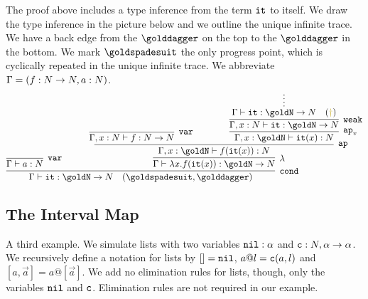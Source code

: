 The proof above includes a type inference from the term ${\tt it}$ to itself.
We draw the type inference in the picture below and we outline the unique
infinite trace. We have a back edge from the 
$\golddagger$ on the top to the $\golddagger$ in the bottom.
We mark $\goldspadesuit$ the only progress point, which is cyclically repeated in 
the unique infinite trace. We abbreviate $\Gamma = (f:{N} \rightarrow {N}, a:{N})$.
\[
{
    \infer[\cond]{ %
      \Gamma 
      \vdash \iter: \goldN \rightarrow \N 
        \quad (\goldspadesuit, \golddagger)
     }{ 
         \infer[\var]{
       \Gamma 
      \vdash a:\N}{}
     &
        {\ \ \ \ \ \ }
        {\infer[\lambda] %
         {
         \Gamma
          \vdash \lambda x.f(\iter(x)):\goldN \rightarrow \N
         }{
         \infer[\ap]{ %
           \Gamma, x:\goldN
          \vdash f(\iter(x)):\N
           }{
          \infer[\var]{
       \Gamma, x:\N 
      \vdash f:\N \rightarrow \N}{}
           {\ \ \ \ \ \ \ \ \ \ \ \ }
           {\infer[\apvar] %
            {\Gamma, x:\goldN
        \vdash \iter(x): \N 
             }{
          \infer[\weak]{\Gamma, x:\N
                                 \vdash \iter: \goldN \rightarrow \N}
                                {\infer*{\Gamma
                                 \vdash \iter: \goldN \rightarrow \N
                                  \ \ \ (\bfColor{oldgold}{ \dagger})}{}
             }
           }
          }
        }%
      }%
    }%
   }%
 }%
\]




\subsection{The Interval Map}
A third example. We simulate lists with two variables ${\tt nil}:\alpha$ and 
${\tt c}:{N},\alpha \rightarrow \alpha$. We recursively define a notation for lists by $[]={\tt nil}$,
$a @ l={\tt c}(a,l)$ and $[a,\vec{a}] = a @ [\vec{a}]$. We add no elimination rules for lists, though,
only the variables ${\tt nil}$ and ${\tt c}$. Elimination rules are not required in our example.

